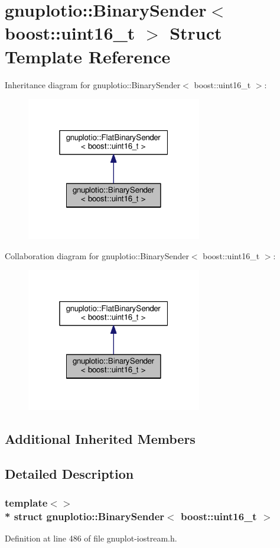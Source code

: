 \hypertarget{structgnuplotio_1_1_binary_sender_3_01boost_1_1uint16__t_01_4}{}\section{gnuplotio\+:\+:Binary\+Sender$<$ boost\+:\+:uint16\+\_\+t $>$ Struct Template Reference}
\label{structgnuplotio_1_1_binary_sender_3_01boost_1_1uint16__t_01_4}


Inheritance diagram for gnuplotio\+:\+:Binary\+Sender$<$ boost\+:\+:uint16\+\_\+t $>$\+:\nopagebreak
\begin{figure}[H]
\begin{center}
\leavevmode
\includegraphics[width=217pt]{structgnuplotio_1_1_binary_sender_3_01boost_1_1uint16__t_01_4__inherit__graph}
\end{center}
\end{figure}


Collaboration diagram for gnuplotio\+:\+:Binary\+Sender$<$ boost\+:\+:uint16\+\_\+t $>$\+:\nopagebreak
\begin{figure}[H]
\begin{center}
\leavevmode
\includegraphics[width=217pt]{structgnuplotio_1_1_binary_sender_3_01boost_1_1uint16__t_01_4__coll__graph}
\end{center}
\end{figure}
\subsection*{Additional Inherited Members}


\subsection{Detailed Description}
\subsubsection*{template$<$$>$\\*
struct gnuplotio\+::\+Binary\+Sender$<$ boost\+::uint16\+\_\+t $>$}



Definition at line 486 of file gnuplot-\/iostream.\+h.

